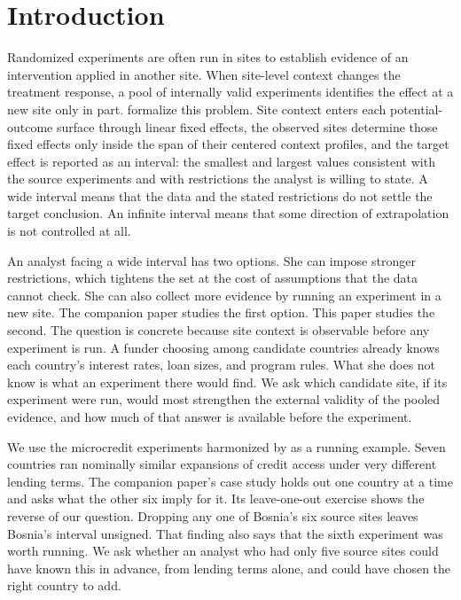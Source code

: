 \section{Introduction}
\label{sec:intro}

Randomized experiments are often run in sites to establish evidence of an intervention applied in another site. When site-level context changes the treatment response, a
pool of internally valid experiments identifies the effect at a new site
only in part. \citet{boyarsky2026} formalize this problem. Site context
enters each potential-outcome surface through linear fixed effects, the
observed sites determine those fixed effects only inside the span of
their centered context profiles, and the target effect is reported as an
interval: the smallest and largest values consistent with the source
experiments and with restrictions the analyst is willing to state. A wide interval means that the data and the stated restrictions do not
settle the target conclusion. An infinite interval means that some
direction of extrapolation is not controlled at all.

An analyst facing a wide interval has two options. She can impose stronger restrictions, which tightens the set at the cost
of assumptions that the data cannot check. She can also collect more
evidence by running an experiment in a new site. The companion paper studies the first option.
This paper studies the second. The question is concrete because site
context is observable before any experiment is run. A funder choosing
among candidate countries already knows each country's interest rates,
loan sizes, and program rules. What she does not know is what an
experiment there would find. We ask which candidate site, if its
experiment were run, would most strengthen the external validity of the
pooled evidence, and how much of that answer is available before the
experiment.

We use the microcredit experiments harmonized by
\citet{meager2019understanding} as a running example. Seven countries ran nominally similar
expansions of credit access under very different lending terms. The
companion paper's case study holds out one country at a time and asks
what the other six imply for it. Its leave-one-out exercise shows the reverse of our question. Dropping
any one of Bosnia's six source sites leaves Bosnia's interval unsigned.
That finding also says that the sixth experiment was worth running. We ask whether an analyst who had only five
source sites could have known this in advance, from lending terms alone, and
could have chosen the right country to add.

